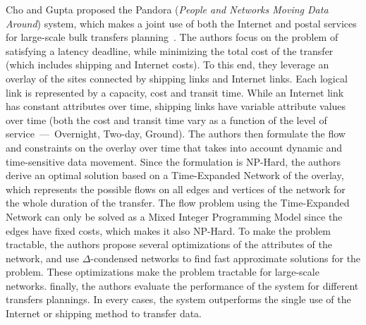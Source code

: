 Cho and Gupta proposed the Pandora (\textit{People and Networks Moving Data Around}) system, which makes a joint use of both the Internet and postal services for large-scale bulk transfers planning~\cite{cho2010new,cho2011budget}. The authors focus on the problem of satisfying a latency deadline, while minimizing the total cost of the transfer (which includes shipping and Internet costs). To this end, they leverage an overlay of the sites connected by shipping links and Internet links. Each logical link is represented by a capacity, cost and transit time. While an Internet link has constant attributes over time, shipping links have variable attribute values over time (\eg both the cost and transit time vary as a function of the level of service~---~Overnight, Two-day, Ground). The authors then formulate the flow and constraints on the overlay over time that takes into account dynamic and time-sensitive data movement. Since the formulation is NP-Hard, the authors derive an optimal solution based on a Time-Expanded Network of the overlay, which represents the possible flows on all edges and vertices of the network for the whole duration of the transfer. The flow problem using the Time-Expanded Network can only be solved as a Mixed Integer Programming Model since the edges have fixed costs, which makes it also NP-Hard. To make the problem tractable, the authors propose several optimizations of the attributes of the network, and use $\Delta$-condensed networks to find fast approximate solutions for the problem. These optimizations make the problem tractable for large-scale networks. finally, the authors evaluate the performance of the system for different transfers plannings. In every cases, the system outperforms the single use of the Internet or shipping method to transfer data. 


